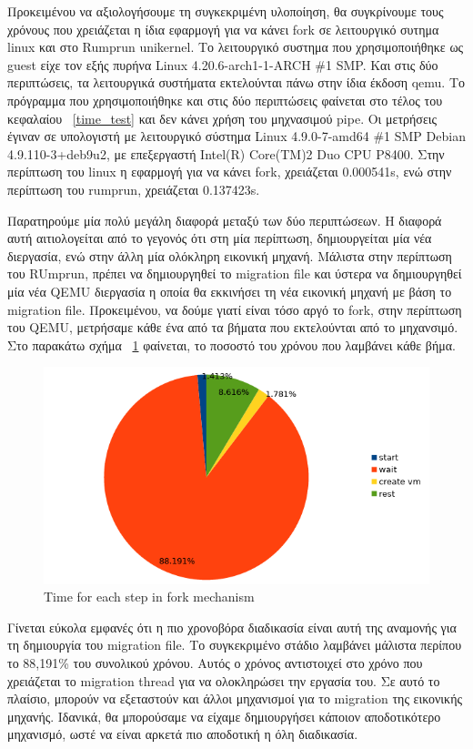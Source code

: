 Προκειμένου να αξιολογήσουμε τη συγκεκριμένη υλοποίηση, θα συγκρίνουμε τους
χρόνους που χρειάζεται η ίδια εφαρμογή για να κάνει fork σε λειτουργικό συτημα
linux και στο Rumprun unikernel. Το λειτουργικό συστημα που χρησιμοποιήθηκε ως
guest είχε τον εξής πυρήνα Linux 4.20.6-arch1-1-ARCH \#1 SMP. Και στις δύο
περιπτώσεις, τα λειτουργικά συστήματα εκτελούνται πάνω στην ίδια έκδοση qemu. Το
πρόγραμμα που χρησιμοποιήθηκε και στις δύο περιπτώσεις φαίνεται στο τέλος του
κεφαλαίου ~\ref{time_test} και δεν κάνει χρήση του μηχνασιμού pipe. Οι μετρήσεις
έγιναν σε υπολογιστή με λειτουργικό σύστημα Linux 4.9.0-7-amd64 \#1 SMP Debian
4.9.110-3+deb9u2, με επεξεργαστή Intel(R) Core(TM)2 Duo CPU P8400. Στην
περίπτωση του linux η εφαρμογή για να κάνει fork, χρειάζεται 0.000541s,  ενώ
στην περίπτωση του rumprun, χρειάζεται 0.137423s. 

Παρατηρούμε μία πολύ μεγάλη διαφορά μεταξύ των δύο περιπτώσεων. Η διαφορά αυτή
αιτιολογείται από το γεγονός ότι στη μία περίπτωση, δημιουργείται μία νέα
διεργασία, ενώ στην άλλη μία ολόκληρη εικονική μηχανή. Μάλιστα στην περίπτωση
του RUmprun, πρέπει να δημιουργηθεί το migration file και ύστερα να
δημιουργηθεί μία νέα QEMU διεργασία η οποία θα εκκινήσει τη νέα εικονική μηχανή
με βάση το migration file. Προκειμένου, να δούμε γιατί είναι τόσο αργό το fork,
στην περίπτωση του QEMU, μετρήσαμε κάθε ένα από τα βήματα που εκτελούνται από 
το μηχανσιμό.  Στο παρακάτω σχήμα ~\ref{fig4_12} φαίνεται, το ποσοστό του χρόνου
που λαμβάνει κάθε βήμα. 

\begin{figure}[htp]
\centerline{\includegraphics[scale=0.8]{figures/fork_pie.png}}
\caption{Time for each step in fork mechanism\label{fig4_12}}
\end{figure}

Γίνεται εύκολα εμφανές ότι η πιο χρονοβόρα διαδικασία είναι αυτή της αναμονής
για τη δημιουργία του migration file. Το συγκεκριμένο στάδιο λαμβάνει μάλιστα
περίπου το 88,191\% του συνολικού χρόνου. Αυτός ο χρόνος αντιστοιχεί στο χρόνο
που χρειάζεται το migration thread για να ολοκληρώσει την εργασία του. Σε αυτό
το πλαίσιο, μπορούν να εξεταστούν και άλλοι μηχανισμοί για το migration της
εικονικής μηχανής. Ιδανικά, θα μπορούσαμε να είχαμε δημιουργήσει κάποιον
αποδοτικότερο μηχανισμό, ωστέ να είναι αρκετά πιο αποδοτική η όλη διαδικασία.

